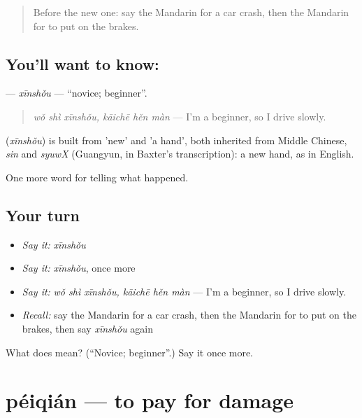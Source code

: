 \begin{quote}
Before the new one: say the Mandarin for a car crash, then the Mandarin for to put on the brakes.
\end{quote}

\subsection*{You'll want to know: }
\textbf{} — \emph{xīnshǒu} — \textquotedblleft{}novice; beginner\textquotedblright{}.

\begin{quote}
\emph{wǒ shì xīnshǒu, kāichē hěn màn} — I'm a beginner, so I drive slowly.
\end{quote}

\begin{cousinweb}
\textbf{} (\emph{xīnshǒu}) is built from  'new' and  'a hand', both inherited from Middle Chinese, \emph{sin} and \emph{syuwX} (Guangyun, in Baxter's transcription): a new hand, as in English.
\end{cousinweb}

\begin{grammarlens}[title={What you've built}]
One more word for telling what happened.
\end{grammarlens}

\subsection*{Your turn}
\begin{itemize}
\raggedright
  \item \emph{Say it:} \emph{xīnshǒu}
  \item \emph{Say it:} \emph{xīnshǒu}, once more
  \item \emph{Say it:} \emph{wǒ shì xīnshǒu, kāichē hěn màn} — I'm a beginner, so I drive slowly.
  \item \emph{Recall:} say the Mandarin for a car crash, then the Mandarin for to put on the brakes, then say \emph{xīnshǒu} again
\end{itemize}

\begin{tcolorbox}[breakable,colback=teal!4,colframe=teal!35!black,title={Before you move on}]
What does  mean? (\textquotedblleft{}Novice; beginner\textquotedblright{}.) Say it once more.
\end{tcolorbox}
\section[péiqián]{péiqián — to pay for damage}


